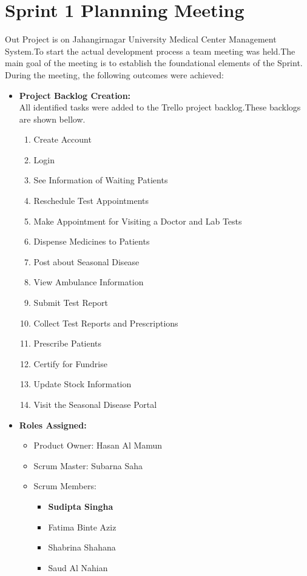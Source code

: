 \documentclass[a4paper,12pt]{article}
\begin{document}
\section{Sprint 1 Plannning Meeting}
Out Project is on Jahangirnagar University Medical Center Management System.To start the actual development
process
a team meeting was held.The main goal of the meeting is to establish the foundational elements of the Sprint. During the meeting, the following outcomes were achieved:
\begin{itemize}
    \item \textbf{Project Backlog Creation:}\\All identified tasks were added to the Trello project
        backlog.These backlogs are shown bellow.
        \begin{enumerate}
            \item Create Account
            \item Login
            \item See Information of Waiting Patients
            \item Reschedule Test Appointments
            \item Make Appointment for Visiting a Doctor and Lab Tests
            \item Dispense Medicines to Patients
            \item Post about Seasonal Disease
            \item View Ambulance Information
            \item Submit Test Report
            \item Collect Test Reports and Prescriptions
            \item Prescribe Patients
            \item Certify for Fundrise
            \item Update Stock Information
            \item Visit the Seasonal Disease Portal
        \end{enumerate}
    \item \textbf{Roles Assigned:}
        \begin{itemize}
            \item Product Owner: Hasan Al Mamun
            \item Scrum Master: Subarna Saha
            \item Scrum Members: 
                \begin{itemize}
                    \item \textbf{Sudipta Singha}
                    \item Fatima Binte Aziz
                    \item Shabrina Shahana
                    \item Saud Al Nahian


\end{itemize}
\end{itemize}
\end{itemize}
\end{document}
